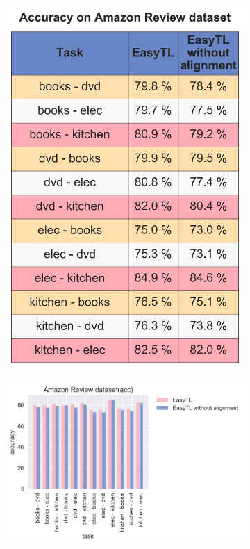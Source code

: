 \begin{figure}
	\centering
	\begin{subfigure}[b]{0.2\textwidth}
		\centering
		\includegraphics[width=0.85\linewidth]{images/1_1.jpg}
		\caption{}
	\end{subfigure}%
	\begin{subfigure}[b]{0.4\textwidth}
		\centering
		\includegraphics[width=\linewidth]{images/1_2.jpg}

\end{subfigure}
\end{figure}
